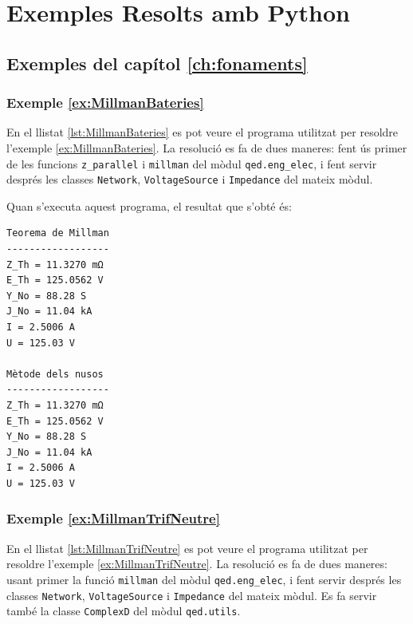 \chapter{Exemples Resolts amb Python}\label{chap:python-exemples}


\section{Exemples del capítol \ref*{ch:fonaments}}

\hypertarget{exemple:MillmanBateries}{\subsection{Exemple \ref*{ex:MillmanBateries} \MillmanBateries}}

En el llistat \vref{lst:MillmanBateries} es pot veure el programa utilitzat per resoldre l'exemple \vref{ex:MillmanBateries}. La resolució es fa de dues maneres: fent ús primer de les funcions \texttt{z\_parallel} i \texttt{millman} del mòdul \texttt{qed.eng\_elec}, i fent servir després les classes \texttt{Network}, \texttt{VoltageSource} i \texttt{Impedance}  del mateix mòdul.


Quan s'executa aquest programa, el resultat que s'obté és:
\lstset{
	language=,
	numbers=none,
	frame=none
}
\begin{lstlisting}
Teorema de Millman
------------------
Z_Th = 11.3270 mΩ
E_Th = 125.0562 V
Y_No = 88.28 S
J_No = 11.04 kA
I = 2.5006 A
U = 125.03 V

Mètode dels nusos
------------------
Z_Th = 11.3270 mΩ
E_Th = 125.0562 V
Y_No = 88.28 S
J_No = 11.04 kA
I = 2.5006 A
U = 125.03 V
\end{lstlisting} 


\hypertarget{exemple:MillmanTrifNeutre}{\subsection{Exemple \ref*{ex:MillmanTrifNeutre} \MillmanTrifNeutre}}

En el llistat \vref{lst:MillmanTrifNeutre} es pot veure el programa utilitzat per resoldre l'exemple \vref{ex:MillmanTrifNeutre}. La resolució es fa de dues maneres: usant primer la funció \texttt{millman} del mòdul \texttt{qed.eng\_elec}, i fent servir després les classes \texttt{Network},  \texttt{VoltageSource} i \texttt{Impedance}  del mateix mòdul. Es fa servir també la classe \texttt{ComplexD} del mòdul \texttt{qed.utils}.


